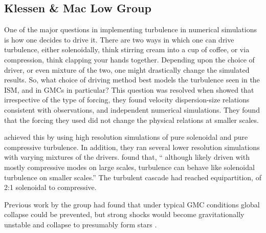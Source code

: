 \documentclass[../dissertation.tex]{subfiles}
\begin{document}

\subsection{Klessen \& Mac Low Group} 
One of the major questions in implementing turbulence in numerical simulations is how one decides to drive it. 
There are two ways in which one can drive turbulence, either solenoidally, think stirring cream into a cup of coffee, 
or via compression, think clapping your hands together. 
Depending upon the choice of driver, or even mixture of the two, one might drastically change the simulated results. 
So, what choice of driving method best models the turbulence seen in the ISM, and in GMCs in particular?
This question was resolved when \citet{2010A&A...512A..81F} showed that irrespective of the type of forcing, 
they found velocity dispersion-size relations consistent with observations, and independent numerical simulations. 
They found that the forcing they used did not change the physical relations at smaller scales. 

\citet{2010A&A...512A..81F} achieved this by using high resolution simulations of pure solenoidal and pure compressive turbulence. 
In addition, they ran several lower resolution simulations with varying mixtures of the drivers.
\citet{2010A&A...512A..81F} found that, `` although likely driven with mostly compressive modes on large scales, turbulence can behave like solenoidal turbulence on smaller scales.''
The turbulent cascade had reached equipartition, of 2:1 solenoidal to compressive. 

Previous work by the group had found that under typical GMC conditions global collapse could be prevented, 
but strong shocks would become gravitationally unstable and collapse to presumably form stars \citep{2000ApJ...535..887K}.
\end{document}
